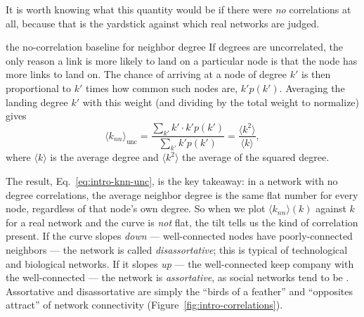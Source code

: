 It is worth knowing what this quantity would be if there were \emph{no}
correlations at all, because that is the yardstick against which real networks
are judged.

\begin{calculation}{the no-correlation baseline for neighbor degree}
If degrees are uncorrelated, the only reason a link is more likely to land on a
particular node is that the node has more links to land on. The chance of
arriving at a node of degree $k'$ is then proportional to $k'$ times how common
such nodes are, $k' p(k')$. Averaging the landing degree $k'$ with this weight
(and dividing by the total weight to normalize) gives
\begin{equation}
  \langle k_{nn} \rangle_{\text{unc}}
  = \frac{\sum_{k'} k'\cdot k' p(k')}{\sum_{k'} k' p(k')}
  = \frac{\langle k^2 \rangle}{\langle k \rangle},
  \label{eq:intro-knn-unc}
\end{equation}
where $\langle k\rangle$ is the average degree and $\langle k^2\rangle$ the
average of the squared degree.
\end{calculation}

The result, Eq.~\eqref{eq:intro-knn-unc}, is the key takeaway: in a network with
no degree correlations, the average neighbor degree is the same flat number for
every node, regardless of that node's own degree. So when we plot $\langle
k_{nn}\rangle(k)$ against $k$ for a real network and the curve is \emph{not}
flat, the tilt tells us the kind of correlation present. If the curve slopes
\emph{down} --- well-connected nodes have poorly-connected neighbors --- the
network is called \emph{disassortative}; this is typical of technological and
biological networks. If it slopes \emph{up} --- the well-connected keep company
with the well-connected --- the network is \emph{assortative}, as social networks
tend to be \citep{newman2002}. Assortative and disassortative are simply the
``birds of a feather'' and ``opposites attract'' of network connectivity
(Figure~\ref{fig:intro-correlations}).

